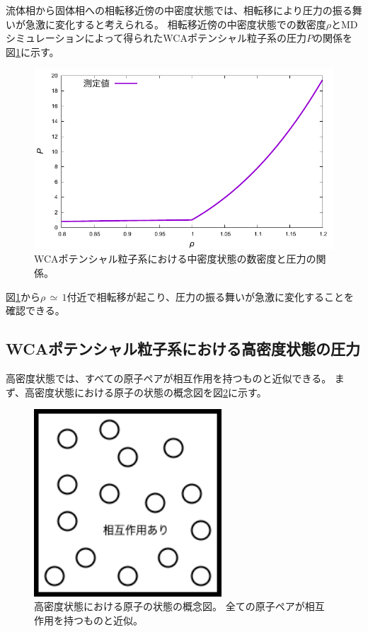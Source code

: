 \documentclass[titlepage]{jsreport}
\begin{document}
{{{流体相から固体相への相転移近傍の中密度状態では、相転移により圧力の振る舞いが急激に変化すると考えられる。
相転移近傍の中密度状態での数密度$\rho$とMDシミュレーションによって得られたWCAポテンシャル粒子系の圧力$P$の関係を
図\ref{fig:middleden_den-pre}に示す。

\newpage
\begin{figure}[htbp]
    \begin{center}
        \includegraphics[width=14cm]{fig/middleden_den-pre.pdf}
    \end{center}
    \caption{WCAポテンシャル粒子系における中密度状態の数密度と圧力の関係。}
    \label{fig:middleden_den-pre}
\end{figure}

図\ref{fig:middleden_den-pre}から$\rho\,{\simeq}\,1$付近で相転移が起こり、圧力の振る舞いが急激に変化することを確認できる。


\newpage
\subsection{WCAポテンシャル粒子系における高密度状態の圧力}\label{results-subsec:WCA-press-high-density}
高密度状態では、すべての原子ペアが相互作用を持つものと近似できる。
まず、高密度状態における原子の状態の概念図を図\ref{fig:highdensity.png}に示す。

\begin{figure}[htbp]
    \begin{center}
        \includegraphics[width=7cm]{fig/highdensity.png}
    \end{center}
    \caption{高密度状態における原子の状態の概念図。
    全ての原子ペアが相互作用を持つものと近似。}
    \label{fig:highdensity.png}
\end{figure}

}}}
\end{document}
